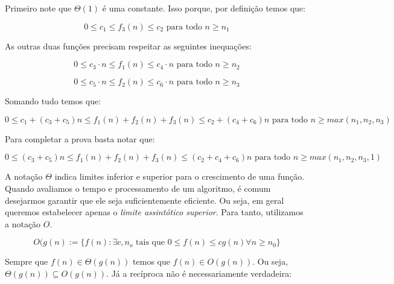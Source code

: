 \begin{example}

  Primeiro note que $\Theta(1)$ é uma constante.
  Isso porque, por definição temos que:

  \begin{displaymath}
    0 \leq c_1 \leq f_3(n) \leq c_2 \textrm{ para todo } n \geq n_1
  \end{displaymath}

  As outras duas funções precisam respeitar as seguintes inequações:

  \begin{displaymath}
    0 \leq c_3\cdot n \leq f_1(n) \leq c_4 \cdot n\textrm{ para todo } n \geq n_2
  \end{displaymath}

  \begin{displaymath}
    0 \leq c_5 \cdot n \leq f_2(n) \leq c_6 \cdot n\textrm{ para todo } n \geq n_3
  \end{displaymath}

  Somando tudo temos que:

  \begin{displaymath}
    0 \leq c_1 + (c_3 + c_5)n \leq f_1(n) + f_2(n) + f_3(n)\leq c_2 + (c_4 + c_6)n \textrm{ para todo } n \geq max(n_1,n_2,n_3)
  \end{displaymath}

  Para completar a prova basta notar que:

  \begin{displaymath}
    0 \leq (c_3 + c_5)n \leq f_1(n) + f_2(n) + f_3(n)\leq (c_2 + c_4 + c_6)n \textrm{ para todo } n \geq max(n_1,n_2,n_3,1)
  \end{displaymath}
  
\end{example}

  A notação $\Theta$ indica limites inferior e superior para o crescimento de uma função.
  Quando avaliamos o tempo e processamento de um algoritmo, é comum desejarmos garantir que ele seja suficientemente eficiente.
  Ou seja, em geral queremos estabelecer apenas o {\em limite assintótico superior}.
  Para tanto, utilizamos a notação $O$.

  \begin{displaymath}
    O(g(n) := \{f(n) : \exists c, n_o \textrm{ tais que } 0 \leq f(n) \leq cg(n) \forall n \geq n_0 \}
  \end{displaymath}

  Sempre que $f(n) \in \Theta(g(n))$ temos que $f(n) \in O(g(n))$.
  Ou seja, $\Theta(g(n)) \subseteq O(g(n))$.
  Já a recíproca não é necessariamente verdadeira:

